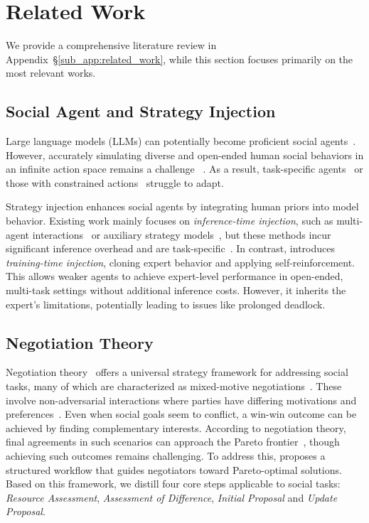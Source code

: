 \section{Related Work}
We provide a comprehensive literature review in Appendix~\S\ref{sub_app:related_work}, while this section focuses primarily on the most relevant works.

\subsection{Social Agent and Strategy Injection}
Large language models (LLMs) can potentially become proficient social agents~\cite{park2023generative,huang2023humanity,choi-etal-2023-llms}. 
% 
However, accurately simulating diverse and open-ended human social behaviors in an infinite action space remains a challenge ~\cite{mou2024individual}.
% 
As a result, task-specific agents~\cite{chen2023money} or those with constrained actions~\cite{deng2023plug,zhang-etal-2024-strength} struggle to adapt.



Strategy injection enhances social agents by integrating human priors into model behavior. 
% 
Existing work mainly focuses on \textit{inference-time injection}, such as multi-agent interactions~\cite{lan-etal-2024-llm} or auxiliary strategy models~\cite{chang-chen-2024-injecting,feng2023towards}, but these methods incur significant inference overhead and are task-specific~\cite{deng2023plug}. 
% 
In contrast, \citet{sotopia-pi} introduces \textit{training-time injection}, cloning expert behavior and applying self-reinforcement. 
% 
This allows weaker agents to achieve expert-level performance in open-ended, multi-task settings without additional inference costs.
However, it inherits the expert’s limitations, potentially leading to issues like prolonged deadlock.


\subsection{Negotiation Theory}
\label{sec:related_work_negotiation}

Negotiation theory~\cite{korobkin2024negotiation} offers a universal strategy framework for addressing social tasks, many of which are characterized as mixed-motive negotiations~\cite{deutsch1973resolution}. 
% 
These involve non-adversarial interactions where parties have differing motivations and preferences~\cite{froman1970compromise}. 
% 
Even when social goals seem to conflict, a win-win outcome can be achieved by finding complementary interests.
% 
According to negotiation theory, final agreements in such scenarios can approach the Pareto frontier~\cite{tripp1992evaluation}, though achieving such outcomes remains challenging. 
% 
To address this, \citet{thompson2015mind} proposes a structured workflow that guides negotiators toward Pareto-optimal solutions. 
% 
Based on this framework, we distill four core steps applicable to social tasks: \textit{Resource Assessment}, \textit{Assessment of Difference}, \textit{Initial Proposal} and \textit{Update Proposal}.